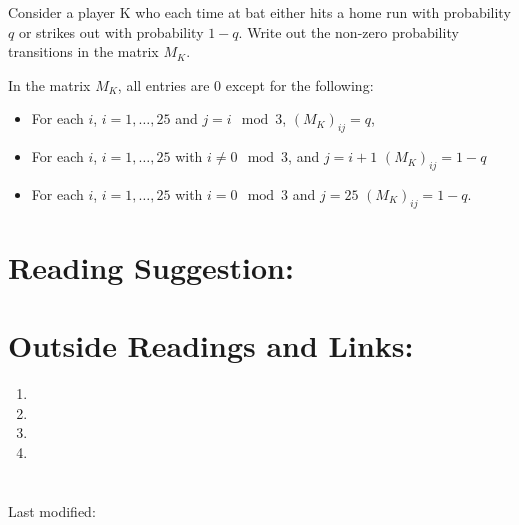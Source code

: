 \documentclass[12pt]{article}
\begin{document}
\begin{exercise}
    Consider a player K who each time at bat either hits a home run with
    probability \( q \) or strikes out with probability \( 1 - q \).
    Write out the non-zero probability transitions in the matrix \( M_{K}
    \).
\end{exercise}

\begin{solution}
    In the matrix \( M_{K} \), all entries are \( 0 \) except for the
    following:
    \begin{itemize}
        \item
            For each \( i \), \( i= 1,\dots, 25 \) and \( j=i \mod 3 \),
            \( (M_K)_{ij} = q \),
        \item
            For each \( i \), \( i= 1,\dots, 25 \) with \( i \ne 0 \mod
            3 \), and \( j=i+1 \) \( (M_K)_{ij} = 1-q \)
        \item
            For each \( i \), \( i= 1,\dots, 25 \) with \( i = 0 \mod 3 \)
            and \( j=25 \) \( (M_K)_{ij} = 1-q \).
    \end{itemize}
\end{solution}

\hr

\section*{Reading Suggestion:}




\hr

\section*{Outside Readings and Links:}
\begin{enumerate}
    \item
    \item
    \item
    \item
\end{enumerate}

\hr

\section*{\solutionsname}
\loadSolutions

\hr

\mydisclaim \myfooter

Last modified:  \flastmod
\end{document}
